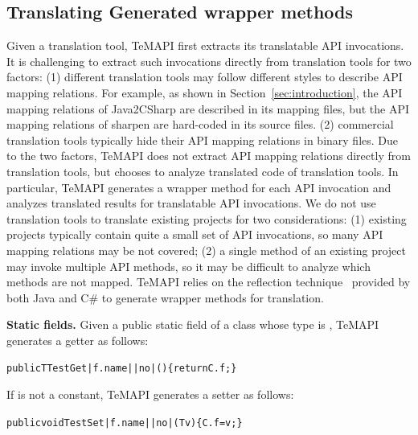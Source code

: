 \subsection{Translating Generated wrapper methods}
\label{sec:approach:generating}
Given a translation tool, TeMAPI first extracts its translatable API invocations. It is challenging to extract such invocations directly from translation tools for two factors: (1) different translation tools may follow different styles to describe API mapping relations. For example, as shown in Section~\ref{sec:introduction}, the API mapping relations of Java2CSharp are described in its mapping files, but the API mapping relations of sharpen are hard-coded in its source files. (2) commercial translation tools typically hide their API mapping relations in binary files. Due to the two factors, TeMAPI does not extract API mapping relations directly from translation tools, but chooses to analyze translated code of translation tools. In particular, TeMAPI generates a wrapper method for each API invocation and analyzes translated results for translatable API invocations. We do not use translation tools to translate existing projects for two considerations: (1) existing projects typically contain quite a small set of API invocations, so many API mapping relations may be not covered; (2) a single method of an existing project may invoke multiple API methods, so it may be difficult to analyze which methods are not mapped. TeMAPI relies on the reflection technique~\cite{maes1987concepts} provided by both Java and C\# to generate wrapper methods for translation.

\textbf{Static fields.} Given a public static field  of a class  whose type is , TeMAPI generates a getter as follows:
\begin{CodeOut}%
\begin{alltt}
 public T TestGet|f.name||no|()\{ return C.f; \}
\end{alltt}
\end{CodeOut}

If  is not a constant, TeMAPI generates a setter as follows:
\begin{CodeOut}%
\begin{alltt}
 public void TestSet|f.name||no|(T v)\{ C.f = v; \}
\end{alltt}
\end{CodeOut}

